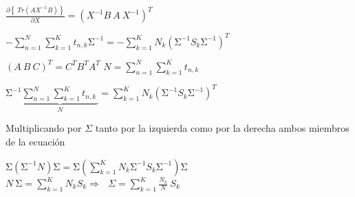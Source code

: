 \documentclass{article}
\begin{document}
\begin{center}
    $\displaystyle \frac{\partial\left\{\ Tr\left(AX^{-1}B\right)\right\}}{\partial X}=\left(X^{-1}B\ A\ X^{-1}\right)^T $
\end{center}

$\displaystyle
    -\sum_{n=1}^{N}\sum_{k=1}^{K}{t_{n,k}\mathrm{\Sigma}^{-1}}=-\sum_{k=1}^{K}N_k\left(\mathrm{\Sigma}^{-1}S_k\mathrm{\Sigma}^{-1}\right)^T
$

\begin{center}
    $\displaystyle \left(A\ B\ C\right)^T=C^TB^TA^T $
    $\displaystyle N=\sum_{n=1}^{N}\sum_{k=1}^{K}{t_{n,k}\ } $
\end{center}

$\displaystyle
    \mathrm{\Sigma}^{-1}\underbrace{
    \sum_{n=1}^{N}{
        \sum_{k=1}^{K}{
            t_{n,k}\ 
        }
    }
    }_N
     =\sum_{k=1}^{K}{
        N_k\left(\mathrm{\Sigma}^{-1}S_k\mathrm{\Sigma}^{-1}\right)^T
     }
$

\begin{center}
    Multiplicando por $\Sigma$ tanto por la izquierda como por la derecha ambos miembros de la ecuaci\'on
\end{center}

$\displaystyle
    \mathrm{\Sigma}\left(\mathrm{\Sigma}^{-1}N\right)\mathrm{\Sigma}=\mathrm{\Sigma}\left(\sum_{k=1}^{K}N_k\mathrm{\Sigma}^{-1}S_k\mathrm{\Sigma}^{-1}\right)\mathrm{\Sigma}
$
$\displaystyle
    N\ \mathrm{\Sigma}=\sum_{k=1}^{K}{N_kS_k}\Longrightarrow\ \ \ \Sigma=\sum_{k=1}^{K}{\frac{N_k}{N}\ S_k}
$
\end{document}
